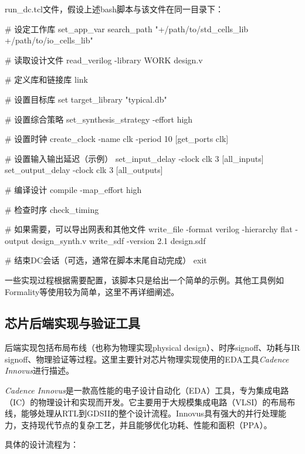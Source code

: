 run\_dc.tcl文件，假设上述bash脚本与该文件在同一目录下：

\begin{CodeBlock}[language=BookTcl]
# 设定工作库  
set_app_var search_path "+/path/to/std_cells_lib +/path/to/io_cells_lib"  
  
# 读取设计文件  
read_verilog -library WORK design.v  
  
# 定义库和链接库  
link  
  
# 设置目标库  
set target_library "typical.db"  
  
# 设置综合策略  
set_synthesis_strategy -effort high  
  
# 设置时钟  
create_clock -name clk -period 10 [get_ports clk]  
  
# 设置输入输出延迟（示例）  
set_input_delay -clock clk 3 [all_inputs]  
set_output_delay -clock clk 3 [all_outputs]  
  
# 编译设计
compile -map_effort high  
  
# 检查时序  
check_timing  
  
# 如果需要，可以导出网表和其他文件  
write_file -format verilog -hierarchy flat -output design_synth.v  
write_sdf -version 2.1 design.sdf  
  
# 结束DC会话（可选，通常在脚本末尾自动完成）  
exit
\end{CodeBlock}

一些实现过程根据需要配置，该脚本只是给出一个简单的示例。其他工具例如Formality等使用较为简单，这里不再详细阐述。

\subsection{芯片后端实现与验证工具}\label{sec:15-chip-preparation-010}

后端实现包括布局布线（也称为物理实现physical
design）、时序signoff、功耗与IR
signoff、物理验证等过程。这里主要针对芯片物理实现使用的EDA工具\emph{Cadence
Innovus}进行描述。

\emph{Cadence
Innovus}是一款高性能的电子设计自动化（EDA）工具，专为集成电路（IC）的物理设计和实现而开发。它主要用于大规模集成电路（VLSI）的布局布线，能够处理从RTL到GDSII的整个设计流程。Innovus具有强大的并行处理能力，支持现代节点的复杂工艺，并且能够优化功耗、性能和面积（PPA）。

具体的设计流程为：

